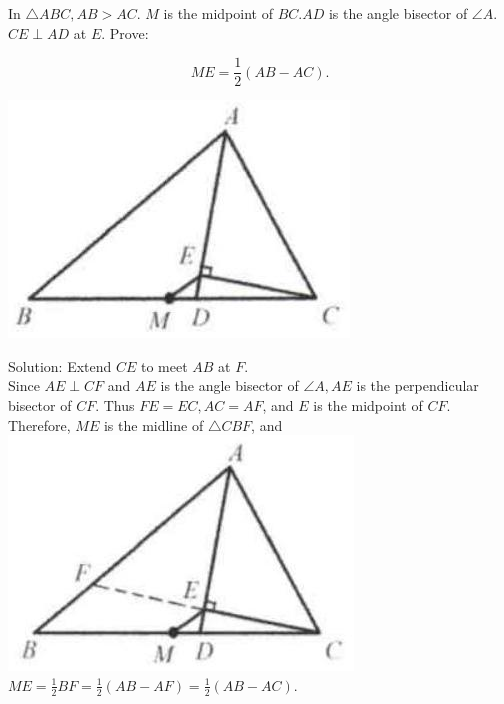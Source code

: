 \documentclass{article}
\begin{document}
In \(\triangle A B C, A B>A C\). \(M\) is the midpoint of \(B C . A D\) is the angle bisector of \(\angle A\). \(C E \perp A D\) at \(E\). Prove:

\[
M E=\frac{1}{2}(A B-A C) .
\]

\begin{center}
\includegraphics[width=\textwidth]{images/038(2).jpg}
\end{center}


Solution:
Extend \(C E\) to meet \(A B\) at \(F\).\\
Since \(A E \perp C F\) and \(A E\) is the angle bisector of \(\angle A, A E\) is the perpendicular bisector of \(C F\). Thus \(F E=E C, A C=A F\), and \(E\) is the midpoint of \(C F\).\\
Therefore, \(M E\) is the midline of \(\triangle C B F\), and\\
\centering
\includegraphics[width=\textwidth]{images/039(3).jpg}\\
\(M E=\frac{1}{2} B F=\frac{1}{2}(A B-A F)=\frac{1}{2}(A B-A C)\).
\end{document}
